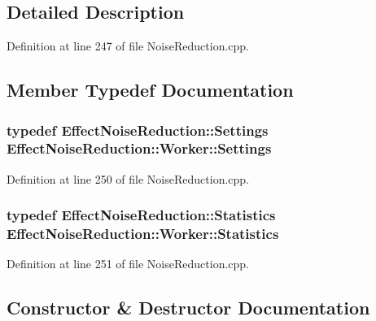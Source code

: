 \subsection{Detailed Description}


Definition at line 247 of file Noise\+Reduction.\+cpp.



\subsection{Member Typedef Documentation}
\subsubsection[{\texorpdfstring{Settings}{Settings}}]{\setlength{\rightskip}{0pt plus 5cm}typedef {\bf Effect\+Noise\+Reduction\+::\+Settings} {\bf Effect\+Noise\+Reduction\+::\+Worker\+::\+Settings}}\hypertarget{class_effect_noise_reduction_1_1_worker_a2904764d08bbfe694e12b1bdd36f41b8}{}\label{class_effect_noise_reduction_1_1_worker_a2904764d08bbfe694e12b1bdd36f41b8}


Definition at line 250 of file Noise\+Reduction.\+cpp.

\subsubsection[{\texorpdfstring{Statistics}{Statistics}}]{\setlength{\rightskip}{0pt plus 5cm}typedef {\bf Effect\+Noise\+Reduction\+::\+Statistics} {\bf Effect\+Noise\+Reduction\+::\+Worker\+::\+Statistics}}\hypertarget{class_effect_noise_reduction_1_1_worker_ac4d7f70570114b011e4e2538cbbe813b}{}\label{class_effect_noise_reduction_1_1_worker_ac4d7f70570114b011e4e2538cbbe813b}


Definition at line 251 of file Noise\+Reduction.\+cpp.



\subsection{Constructor \& Destructor Documentation}
